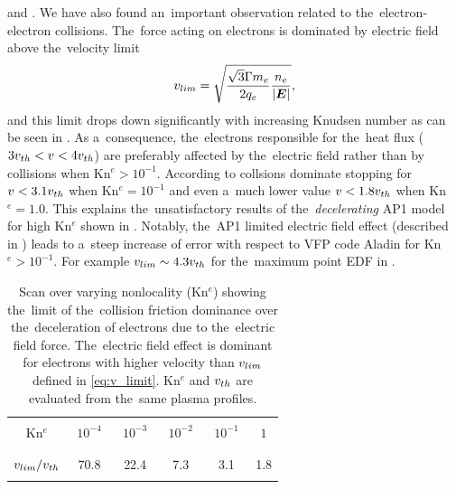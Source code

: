 and . 
We have also found 
an~important observation related to the~electron-electron collisions.
The~force acting on electrons is dominated by
electric field above the~velocity limit
\begin{equation}
  v_{lim} = \sqrt{\frac{\sqrt{3}\Gamma m_e}{2q_e}\frac{n_e}{|\boldsymbol{E}|}}
  ,
  \label{eq:v_limit}
\end{equation}
and this limit drops 
down significantly with increasing Knudsen number as can be seen 
in . 
As a~consequence, the~electrons responsible for the~heat flux
($3 v_{th} < v <4 v_{th}$) are preferably affected by the~electric field
rather than by collisions when Kn$^{e} > 10^{-1}$. According to 
 collsions dominate stopping for $v < 3.1 v_{th}$ 
when Kn$^e = 10^{-1}$ and even a~much lower value $v < 1.8 v_{th}$ 
when Kn$^e = 1.0$. This explains the~unsatisfactory results of 
the~\textit{decelerating} AP1
model for high Kn$^e$ shown in . 
Notably, the~AP1 limited electric field effect (described in 
) leads to a~steep increase of error with respect 
to VFP code Aladin for Kn$^e > 10^{-1}$. 
For example $v_{lim}\sim 4.3v_{th}$ for the~maximum point EDF in 
.

\begin{table}
\begin{center}
  \begin{tabular}{c|ccccc}
    \hline\hline\\
    Kn$^e$ & $\,\,10^{-4}\,\,$ & $\,\,10^{-3}\,\,$ & $\,\,10^{-2}\,\,$ & $\,\,10^{-1}\,\,$ & $\,\,1\,\,$ \\\\
    \hline\\
    $v_{lim} / v_{th}$ & 70.8 & 22.4 & 7.3 & 3.1 & 1.8\\\\
    \hline\hline
  \end{tabular}
  \caption{
  Scan over varying nonlocality (Kn$^e$) showing the~limit of 
  the~collision friction dominance over the~deceleration of electrons 
  due to the~electric field force. The~electric field effect is dominant
  for electrons with higher velocity than $v_{lim}$ defined in 
  \eqref{eq:v_limit}. Kn$^e$ and $v_{th}$ are evaluated from the~same 
  plasma profiles.
  }
\label{tab:vlim}
\end{center}
\end{table}


